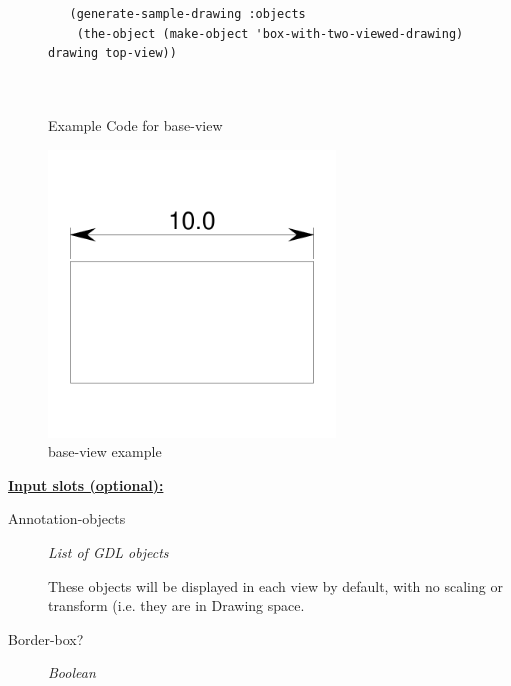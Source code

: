 \documentclass [11pt]{book}
\begin{document}
\begin{itemize}
\begin{figure}
\begin{lrbox}{\boxedverb}
\begin{minipage}{\linewidth}
{\begin{verbatim}
   (generate-sample-drawing :objects 
    (the-object (make-object 'box-with-two-viewed-drawing) drawing top-view))
 
 
\end{verbatim}}
\end{minipage}
\end{lrbox}
\fbox{\usebox{\boxedverb}}

\caption{Example Code for base-view}

\label{fig:example-code-base-view}

\end{figure}

\begin{figure}
\begin{center}
\includegraphics[width=3in,height=3in]{../images/example-base-view.pdf}
\end{center}

\caption{base-view example}

\label{fig:base-view}

\end{figure}





\textbf{
\underline{Input slots (optional):}}

\begin{description}

\item [Annotation-objects]
\emph{List of GDL objects}

 These objects will be displayed in each view by default, with no scaling or transform (i.e. they are in Drawing space.




\item [Border-box?]
\emph{Boolean}


\end{description}
\end{itemize}
\end{document}
